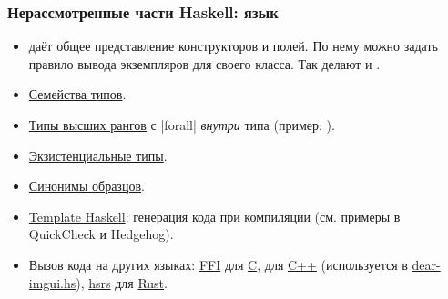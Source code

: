 \documentclass[11pt]{beamer}
\begin{document}
\begin{frame}[fragile]
  \frametitle{Нерассмотренные части Haskell: язык}
  \small
  \begin{itemize}
    \item \href{https://downloads.haskell.org/ghc/latest/docs/users_guide/exts/generics.html}{} даёт общее представление конструкторов и полей. По нему можно задать правило вывода экземпляров для своего класса. Так делают  и .
    \item \href{https://downloads.haskell.org/ghc/latest/docs/users_guide/exts/type_families.html}{Семейства типов}.
    \item \href{https://downloads.haskell.org/ghc/latest/docs/users_guide/exts/rank_polymorphism.html}{Типы высших рангов} с \haskinline|forall| \emph{внутри} типа (пример: \href{https://hackage.haskell.org/package/base/docs/Control-Monad-ST.html#v:runST}{}).
    \item \href{https://downloads.haskell.org/ghc/latest/docs/users_guide/exts/existential_quantification.html}{Экзистенциальные типы}.
    \item \href{https://downloads.haskell.org/ghc/latest/docs/users_guide/exts/pattern_synonyms.html}{Синонимы образцов}.
    \item \href{https://downloads.haskell.org/ghc/latest/docs/users_guide/exts/template_haskell.html}{Template Haskell}: генерация кода при компиляции (см. примеры в QuickCheck и Hedgehog).
    \item Вызов кода на других языках: \href{https://downloads.haskell.org/ghc/latest/docs/users_guide/exts/ffi.html}{FFI} для \href{https://www.open-std.org/jtc1/sc22/wg14/}{C},  для \href{https://www.open-std.org/jtc1/sc22/wg21/}{C++} (используется в \href{https://github.com/haskell-game/dear-imgui.hs}{dear-imgui.hs}), \href{https://github.com/harmont-dev/hsrs}{hsrs} для \href{https://rust-lang.org/}{Rust}.
  \end{itemize}
\end{frame}
\end{document}
